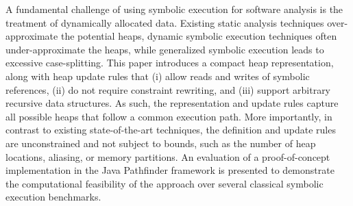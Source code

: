 A fundamental challenge of using symbolic execution for software
analysis is the treatment of dynamically allocated data. Existing
static analysis techniques over-approximate the potential heaps,
dynamic symbolic execution techniques often under-approximate the
heaps, while generalized symbolic execution leads to excessive
case-splitting. This paper introduces a compact heap representation,
along with heap update rules that (i) allow reads and writes of
symbolic references, (ii) do not require constraint rewriting, and
(iii) support arbitrary recursive data structures. As such, the
representation and update rules capture all possible heaps that follow
a common execution path. More importantly, in contrast to existing
state-of-the-art techniques, the definition and update rules are
unconstrained and not subject to bounds, such as the number of heap
locations, aliasing, or memory partitions. An evaluation of a
proof-of-concept implementation in the Java Pathfinder framework is
presented to demonstrate the computational feasibility of the approach
over several classical symbolic execution benchmarks.
